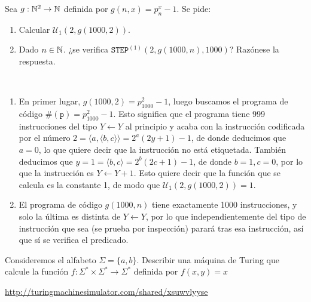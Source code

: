 \documentclass[twoside]{article}
\begin{document}
\begin{ejercicio}{4}
Sea $g : \mathbb{N}^2 \to \mathbb{N}$ definida por $g(n, x) = p^x_n - 1$. Se pide:
\begin{enumerate}
\item Calcular $\mathcal{U}_1(2, g(1000, 2))$.
\item Dado $n \in \mathbb{N}$. ¿se verifica $\texttt{STEP}^{(1)}(2, g(1000, n), 1000)$? Razónese la respuesta.
\end{enumerate}
\end{ejercicio}
\begin{solucion}\
\begin{enumerate}
\item En primer lugar, $g(1000,2)=p_{1000}^2-1$, luego buscamos el programa de código $\#(\texttt{p})=p_{1000}^2-1$. Esto significa que el programa tiene 999 instrucciones del tipo $Y\leftarrow Y$ al principio y acaba con la instrucción codificada por el número $2=\langle a,\langle b,c\rangle\rangle=2^a(2y+1)-1$, de donde deducimos que $a=0$, lo que quiere decir que la instrucción no está etiquetada. También deducimos que $y=1=\langle b,c\rangle=2^b(2c+1)-1$, de donde $b=1, c=0$, por lo que la instrucción es $Y\leftarrow Y+1$. Esto quiere decir que la función que se calcula es la constante 1, de modo que $\mathcal{U}_1(2, g(1000, 2))=1$.
\item El programa de código $g(1000,n)$ tiene exactamente 1000 instrucciones, y solo la última es distinta de $Y\leftarrow Y$, por lo que independientemente del tipo de instrucción que sea (se prueba por inspección) parará tras esa instrucción, así que sí se verifica el predicado. 
\end{enumerate}
\end{solucion}

\newpage

\begin{ejercicio}{5}
Consideremos el alfabeto $\Sigma = \{a, b\}$. Describir una máquina de
Turing que calcule la función $f : \Sigma^* \times \Sigma^* \to \Sigma^*$ definida por $f(x, y) = x$
\end{ejercicio}
\begin{solucion}
\url{http://turingmachinesimulator.com/shared/xsuwvlyyse}
\end{solucion}
\end{document}
